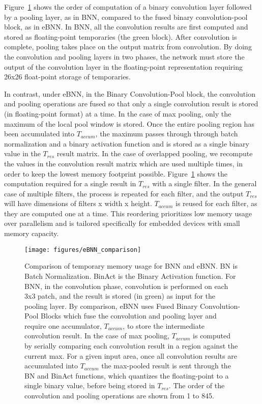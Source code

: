 \documentclass[10pt,emptycopyrightspace]{ewsn-proc}
\begin{document}
Figure~\ref{fig:eBNN_comparison} shows the order of computation of a binary convolution layer followed by a pooling layer, as in BNN, compared to the fused binary convolution-pool block, as in eBNN. In BNN, all the convolution results are first computed and stored as floating-point temporaries (the green block). After convolution is complete, pooling takes place on the output matrix from convolution. By doing the convolution and pooling layers in two phases, the network must store the output of the convolution layer in the floating-point representation requiring 26x26 float-point storage of temporaries.

In contrast, under eBNN, in the Binary Convolution-Pool block, the convolution and pooling operations are fused so that only a single convolution result is stored (in floating-point format) at a time. In the case of max pooling, only the maximum of the local pool window is stored. Once the entire pooling region has been accumulated into $T_{accum}$, the maximum passes through through batch normalization and a binary activation function and is stored as a single binary value in the $T_{res}$ result matrix. In the case of overlapped pooling, we recompute the values in the convolution result matrix which are used multiple times, in order to keep the lowest memory footprint possible. Figure~\ref{fig:eBNN_comparison} shows the computation required for a single result in $T_{res}$ with a single filter. In the general case of multiple filters, the process is repeated for each filter, and the output $T_{res}$ will have dimensions of filters x width x height. $T_{accum}$ is reused for each filter, as they are computed one at a time. This reordering prioritizes low memory usage over parallelism and is tailored specifically for embedded devices with small memory capacity.

\begin{figure}[b!]
  \centering
    \texttt{[image: figures/eBNN\_comparison]}
  \caption{Comparison of temporary memory usage for BNN and eBNN. BN is Batch Normalization. BinAct is the Binary Activation function. For BNN, in the convolution phase, convolution is performed on each 3x3 patch, and the result is stored (in green) as input for the pooling layer. By comparison, eBNN uses Fused Binary Convolution-Pool Blocks which fuse the convolution and pooling layer and require one accumulator, $T_{accum}$, to store the intermediate convolution result. In the case of max pooling, $T_{accum}$ is computed by serially comparing each convolution result in a region against the current max. For a given input area, once all convolution results are accumulated into $T_{accum}$ the max-pooled result is sent through the BN and BinAct functions, which quantizes the floating-point to a single binary value, before being stored in $T_{res}$. The order of the convolution and pooling operations are shown from 1 to 845.}
  \label{fig:eBNN_comparison}
\end{figure}
\end{document}
